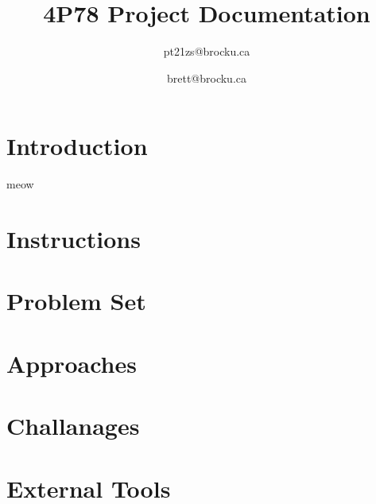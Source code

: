 \documentclass[conference]{IEEEtran}
\begin{document}
\title{4P78 Project Documentation\\}

\author{
    pt21zs@brocku.ca
    \and
    brett@brocku.ca
}
\maketitle

\section{Introduction}
meow

\section{Instructions}
\section{Problem Set}
\section{Approaches}
\section{Challanages}
\section{External Tools}

\nocite{*}


\end{document}
